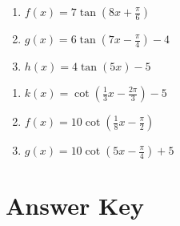 \smallskip
\begin{multicols}{3}
\begin{enumerate}	\setcounter{enumi}{\value{Review}}
	\item $f(x) = 7\tan\left(8x+\frac{\pi}{6}\right)$
	\item $g(x) = 6\tan\left(7x-\frac{\pi}{4}\right)-4$
	\item $h(x) = 4\tan(5x)-5$
\end{enumerate}	\setcounter{Review}{\value{enumi}}
\end{multicols}
\smallskip
\begin{multicols}{3}
\begin{enumerate}	\setcounter{enumi}{\value{Review}}
	\item $k(x) = \cot\left(\frac{1}{3}x-\frac{2\pi}{3}\right)-5$
	\item $f(x) = 10\cot\left(\frac{1}{8}x-\frac{\pi}{2}\right)$
	\item $g(x) = 10\cot\left(5x-\frac{\pi}{4}\right)+5$
\end{enumerate}
\end{multicols}

\newpage

\section{Answer Key}

